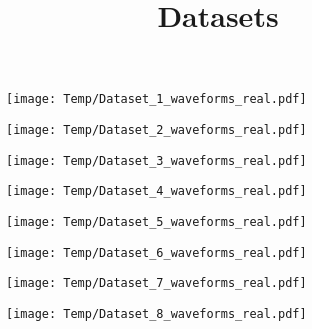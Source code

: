 \documentclass[14pt,a4paper]{extarticle}
\title{Datasets}
\author{}
\date{}
\begin{document}
\begin{figure}
\centering
\texttt{[image: Temp/Dataset\_1\_waveforms\_real.pdf]}
\end{figure}

\begin{figure}
\centering
\texttt{[image: Temp/Dataset\_2\_waveforms\_real.pdf]}
\end{figure}

\begin{figure}
\centering
\texttt{[image: Temp/Dataset\_3\_waveforms\_real.pdf]}
\end{figure}

\begin{figure}
\centering
\texttt{[image: Temp/Dataset\_4\_waveforms\_real.pdf]}
\end{figure}

\begin{figure}
\centering
\texttt{[image: Temp/Dataset\_5\_waveforms\_real.pdf]}
\end{figure}

\begin{figure}
\centering
\texttt{[image: Temp/Dataset\_6\_waveforms\_real.pdf]}
\end{figure}

\begin{figure}
\centering
\texttt{[image: Temp/Dataset\_7\_waveforms\_real.pdf]}
\end{figure}

\begin{figure}
\centering
\texttt{[image: Temp/Dataset\_8\_waveforms\_real.pdf]}
\end{figure}
\end{document}
